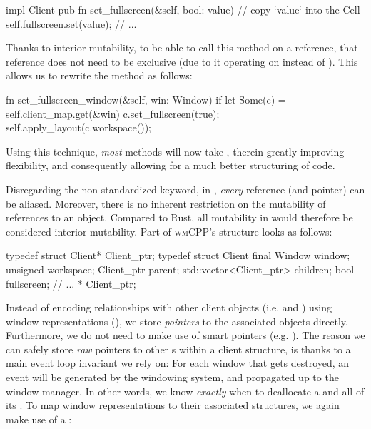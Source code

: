 \begin{rustblock}
  impl Client {
    pub fn set_fullscreen(&self, bool: value) {
      // copy `value` into the Cell
      self.fullscreen.set(value);
    }
    // ...
  }
\end{rustblock}

Thanks to interior mutability, to be able to call this method on a 
reference, that reference does not need to be exclusive (due to it operating
on  instead of ). This allows us to rewrite the
 method as follows:

\begin{rustblock}
  fn set_fullscreen_window(&self, win: Window) {
    if let Some(c) = self.client_map.get(&win) {
      c.set_fullscreen(true);
      self.apply_layout(c.workspace());
    }
  }
\end{rustblock}

Using this technique, \textit{most}  methods will now take
, therein greatly improving flexibility, and consequently allowing
for a much better structuring of code.


Disregarding the non-standardized  keyword, in \cpp,
\textit{every} reference (and pointer) can be aliased\cite{cppstd}. Moreover,
there is no inherent restriction on the mutability of references to an object.
Compared to Rust, all mutability in \cpp would therefore be considered interior
mutability. Part of \textsc{wmCPP}'s  structure looks as follows:

\begin{cppblock}
  typedef struct Client* Client_ptr;
  typedef struct Client final
  {
    Window window;
    unsigned workspace;
    Client_ptr parent;
    std::vector<Client_ptr> children;
    bool fullscreen;
    // ...
  }* Client_ptr;
\end{cppblock}

Instead of encoding relationships with other client objects (i.e. 
and ) using window representations (), we store
\textit{pointers} to the associated objects directly. Furthermore, we do not
need to make use of smart pointers (e.g. ). The reason we
can safely store \textit{raw} pointers to other s within a client
structure, is thanks to a main event loop invariant we rely on: For each window
that gets destroyed, an event will be generated by the windowing system, and
propagated up to the window manager. In other words, we know \textit{exactly}
when to deallocate a  and all of its . To map
window representations to their associated  structures, we again
make use of a :

